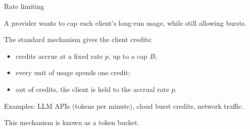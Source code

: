 \documentclass[aspectratio=169]{beamer}
\newenvironment*{myitem}[1][1.5em]{\begin{itemize}\setlength{\itemsep}{#1}}{\end{itemize}}
\begin{document}
\begin{frame}{Rate limiting}

	A provider wants to cap each client's \alert{long-run} usage, while still allowing \alert{bursts}.

	\medskip

	The standard mechanism gives the client \alert{credits}:
	\begin{myitem}[0.7em]
		\item credits accrue at a fixed rate $p$, up to a cap $B$;
		\item every unit of usage spends one credit;
		\item out of credits, the client is held to the accrual rate $p$.
	\end{myitem}

	\vfill

	{\small Examples: LLM APIs (tokens per minute), cloud burst credits, network traffic.}

	\medskip
	\pause

	\begin{block}{}
		\begin{center}
		This mechanism is known as a \alert{token bucket}.
		\end{center}
	\end{block}
\end{frame}
\end{document}
